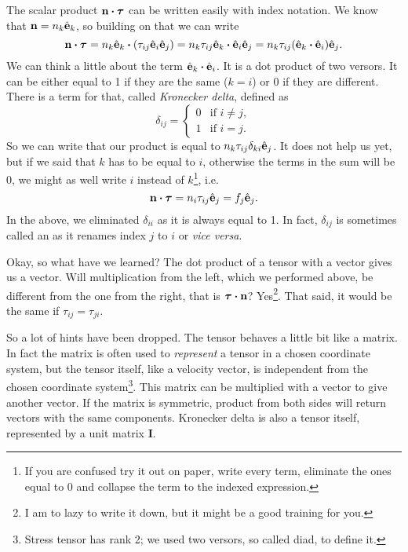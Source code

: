 \documentclass{article}
\begin{document}
The scalar product \(\vb{n}\dotproduct\bm{\tau}\) can be written easily 
with index notation. We know that \(\vb{n} = n_k \hat{\vb{e}}_k\), so 
building on that we can write
\[
  \vb{n}\dotproduct\bm{\tau} 
  = n_k \hat{\vb{e}}_k \dotproduct \qty(\tau_{ij}\hat{\vb{e}}_i \hat{\vb{e}}_j)
  = n_k \tau_{ij} \hat{\vb{e}}_k \dotproduct \hat{\vb{e}}_i \hat{\vb{e}}_j 
  = n_k \tau_{ij} \qty(\hat{\vb{e}}_k \dotproduct \hat{\vb{e}}_i) \hat{\vb{e}}_j.
\]
We can think a little about the term \(\hat{\vb{e}}_k \dotproduct \hat{\vb{e}}_i\).
It is a dot product of two versors. It can be either equal to 1 if they are 
the same (\(k=i\)) or 0 if they are different. There is a term for that, called
\emph{Kronecker delta}, defined as
\[
  \delta_{ij} = \begin{cases}
0 &\text{if } i \neq j,   \\
1 &\text{if } i=j.   \end{cases}
\]
So we can write that our product is equal to 
\(n_k \tau_{ij}\delta_{ki} \hat{\vb{e}}_j \). It does not help us yet, but if 
we said that \(k\) has to be equal to \(i\), otherwise the terms in the sum 
will be 0, we might as well write \(i\) instead of \(k\)\footnote{If you are 
confused try it out on paper, write every term, eliminate the ones equal to 0
and collapse the term to the indexed expression.}, i.e.\
\[
  \vb{n}\dotproduct\bm{\tau} = n_i \tau_{ij} \hat{\vb{e}}_j = f_j \hat{\vb{e}}_j.
\]
In the above, we eliminated \(\delta_{ii}\) as it is always equal to 1. In fact,
\(\delta_{ij}\) is sometimes called an \say{index renamer} as it renames index 
\(j\) to \(i\) or \textit{vice versa}.

Okay, so what have we learned? The dot product of a tensor with a vector gives 
us a vector. Will multiplication from the left, which we performed above, be 
different from the one from the right, that is \(\bm{\tau}\dotproduct\vb{n}\)?
Yes\footnote{I am to lazy to write it down, but it might be a good training
for you.}. That said, it would be the same if \(\tau_{ij} = \tau_{ji}\).

So a lot of hints have been dropped. The tensor behaves a little bit like a 
matrix. In fact the matrix is often used to \emph{represent} a tensor in a 
chosen coordinate system, but the tensor itself, like a velocity vector, is 
independent from the chosen coordinate system\footnote{Stress tensor has rank 2; we 
used two versors, so called diad, to define it.}. This matrix can be multiplied with a vector to give 
another vector. If the matrix is symmetric, product from both sides will return vectors 
with the same components. Kronecker delta is also a tensor itself, represented by
a unit matrix \(\bm{I}\).
\end{document}
